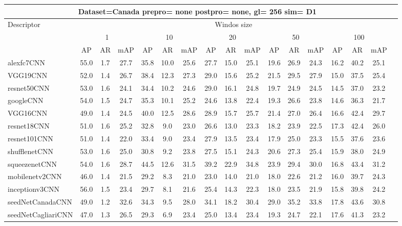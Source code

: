 \documentclass[12pt,italian]{article}
\begin{document}
 \pagebreak 
\begin{longtable}{lcccccccccccccccc}
\toprule
\multicolumn{16}{c}{Dataset=Canada prepro= none postpro= none, gl= 256 sim= D1} \\ 
\toprule
Descriptor & \multicolumn{15}{c}{Windos size} \\ 
& \multicolumn{3}{c}{1} & \multicolumn{3}{c}{10} & \multicolumn{3}{c}{20} & \multicolumn{3}{c}{50} & \multicolumn{3}{c}{100} \\ 
& AP & AR & mAP & AP & AR & mAP & AP & AR & mAP & AP & AR & mAP & AP & AR & mAP \\ 
\midrule
alexfc7CNN & 55.0 &  1.7 & 27.7 & 35.8 & 10.0 & 25.6 & 27.7 & 15.0 & 25.1 & 19.6 & 26.9 & 24.3 & 16.2 & 40.2 & 25.1 \\ 
VGG19CNN & 52.0 &  1.4 & 26.7 & 38.4 & 12.3 & 27.3 & 29.0 & 15.6 & 25.2 & 21.5 & 29.5 & 27.9 & 15.0 & 37.5 & 25.4 \\ 
resnet50CNN & 53.0 &  1.6 & 24.1 & 34.4 & 10.2 & 24.6 & 29.0 & 16.1 & 24.8 & 19.7 & 24.9 & 24.5 & 14.5 & 37.0 & 23.2 \\ 
googleCNN & 54.0 &  1.5 & 24.7 & 35.3 & 10.1 & 25.2 & 24.6 & 13.8 & 22.4 & 19.3 & 26.6 & 23.8 & 14.6 & 36.3 & 21.7 \\ 
VGG16CNN & 49.0 &  1.4 & 24.5 & 40.0 & 12.5 & 28.6 & 28.9 & 15.7 & 25.7 & 21.4 & 27.0 & 26.4 & 16.6 & 42.4 & 29.7 \\ 
resnet18CNN & 51.0 &  1.6 & 25.2 & 32.8 &  9.0 & 23.0 & 26.6 & 13.0 & 23.3 & 18.2 & 23.9 & 22.5 & 17.3 & 42.4 & 26.0 \\ 
resnet101CNN & 51.0 &  1.4 & 22.0 & 33.4 &  9.0 & 23.4 & 27.9 & 13.5 & 23.4 & 17.9 & 25.0 & 23.3 & 15.5 & 37.6 & 23.6 \\ 
shufflenetCNN & 53.0 &  1.6 & 25.0 & 30.8 &  9.2 & 23.8 & 27.5 & 15.1 & 24.3 & 20.6 & 27.3 & 25.4 & 15.9 & 38.0 & 24.9 \\ 
squeezenetCNN & 54.0 &  1.6 & 28.7 & 44.5 & 12.6 & 31.5 & 39.2 & 22.9 & 34.8 & 23.9 & 29.4 & 30.0 & 16.8 & 43.4 & 31.2 \\ 
mobilenetv2CNN & 46.0 &  1.4 & 21.5 & 29.2 &  8.3 & 21.0 & 23.0 & 14.0 & 21.0 & 18.0 & 22.6 & 21.2 & 16.0 & 39.7 & 24.3 \\ 
inceptionv3CNN & 56.0 &  1.5 & 23.4 & 29.7 &  8.1 & 21.6 & 25.4 & 14.3 & 22.3 & 18.0 & 23.5 & 21.9 & 15.8 & 39.8 & 24.2 \\ 
seedNetCanadaCNN & 49.0 &  1.2 & 32.6 & 34.3 &  9.5 & 28.0 & 34.1 & 18.2 & 30.4 & 29.0 & 35.2 & 33.8 & 17.8 & 43.6 & 30.8 \\ 
seedNetCagliariCNN & 47.0 &  1.3 & 26.5 & 29.3 &  6.9 & 23.4 & 25.0 & 13.4 & 23.4 & 19.3 & 24.7 & 22.1 & 17.6 & 41.3 & 23.2 \\ 
\bottomrule
\end{longtable} 

 \pagebreak 
\end{document}

